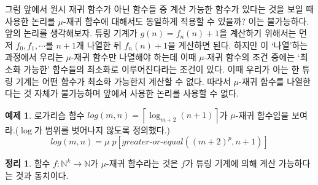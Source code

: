 \documentclass[b5paper]{book}
\theoremstyle{definition}
\newtheorem{thm}{정리}[chapter]
\newtheorem{ex}{예제}[chapter]
\begin{document}
그럼 앞에서 원시 재귀 함수가 아닌 함수들 중 계산 가능한 함수가 있다는 것을 보일 때 사용한 논리를 $\mu$-재귀
함수에 대해서도 동일하게 적용할 수 있을까? 이는 불가능하다. 앞의 논리를 생각해보자. 튜링 기계가 
$g(n) = f_n(n) + 1$을 계산하기 위해서는 먼저 $f_0, f_1, \cdots$를 $n+1$개 나열한 뒤 $f_n(n) + 1$을 
계산하면 된다. 하지만 이 `나열'하는 과정에서 우리는 $\mu$-재귀 함수만 나열해야 하는데 이때 $\mu$-재귀 함수의
조건 중에는 `최소화 가능한' 함수들의 최소화로 이루어진다라는 조건이 있다. 이때 우리가 아는 한
튜링 기계는 어떤 함수가 최소화 가능한지 계산할 수 없다. 
따라서 $\mu$-재귀 함수를 나열한다는 것 자체가 불가능하며 앞에서 사용한 논리를 사용할 수 없다. 
\begin{ex}
    로가리슴 함수 $log(m,n) = \left\lceil \log_{m+2}(n+1)\right\rceil$가 $\mu$-재귀 함수임을
    보여라.($\log$가 범위를 벗어나지 않도록 정의했다.)
    $$log(m,n) = \mu \; p[greater\text{-}or\text{-}equal((m+2)^p, n+1)]$$
\end{ex}
\begin{thm}
    함수 $f: \mathbb{N}^k \rightarrow \mathbb{N}$가 $\mu$-재귀 함수라는 것은 $f$가 튜링 기계에 의해 
    계산 가능하다는 것과 동치이다.  
\end{thm}
\end{document}
